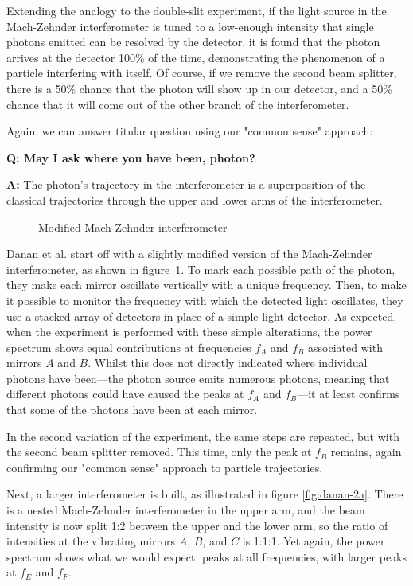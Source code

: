 \documentclass{article}
\newcommand{\Q}{\bfseries Q: }
\newcommand{\A}{\par\textbf{A:} \normalfont}
\begin{document}
Extending the analogy to the double-slit experiment, if the light source in the 
Mach-Zehnder interferometer is tuned to a low-enough intensity that single 
photons emitted can be resolved by the detector, it is found that the photon 
arrives at the detector 100\% of the time, demonstrating the phenomenon of a 
particle interfering with itself.  Of course, if we remove the second beam 
splitter, there is a 50\% chance that the photon will show up in our detector, 
and a 50\% chance that it will come out of the other branch of the 
interferometer. 


Again, we can answer titular question using our "common sense" approach:

\begin{framed}
\Q May I ask where you have been, photon?  

\A The photon's trajectory in the interferometer is a superposition of the 
	classical trajectories through the upper and lower arms of the 
	interferometer.
\end{framed}

\begin{figure}
	\centering
	
	\caption{Modified Mach-Zehnder interferometer}
	\label{fig:danan-1a}
\end{figure}

Danan et al. start off with a slightly modified version of the Mach-Zehnder 
interferometer, as shown in figure~\ref{fig:danan-1a}. To mark each possible 
path of the photon, they make each mirror oscillate vertically with a unique 
frequency.  Then, to make it possible to monitor the frequency with which the 
detected light oscillates, they use a stacked array of detectors in place of a 
simple light detector. As expected, when the experiment is performed with these 
simple alterations, the power spectrum shows equal contributions at frequencies 
$f_A$ and $f_B$ associated with mirrors $A$ and $B$. Whilst this does not 
directly indicated where individual photons have been---the photon source emits 
numerous photons, meaning that different photons could have caused the peaks at 
$f_A$ and $f_B$---it at least confirms that some of the photons have been at 
each mirror. 

In the second variation of the experiment, the same steps are repeated, but 
with the second beam splitter removed. This time, only the peak at $f_B$ 
remains, again confirming our "common sense" approach to particle trajectories. 

Next, a larger interferometer is built, as illustrated in figure 
\ref{fig:danan-2a}. There is a nested Mach-Zehnder interferometer in the upper 
arm, and the beam intensity is now split 1:2 between the upper and the lower 
arm, so the ratio of intensities at the vibrating mirrors $A$, $B$, and $C$ is 
1:1:1.  Yet again, the power spectrum shows what we would expect: peaks at all 
frequencies, with larger peaks at $f_E$ and $f_F$. 
\end{document}
